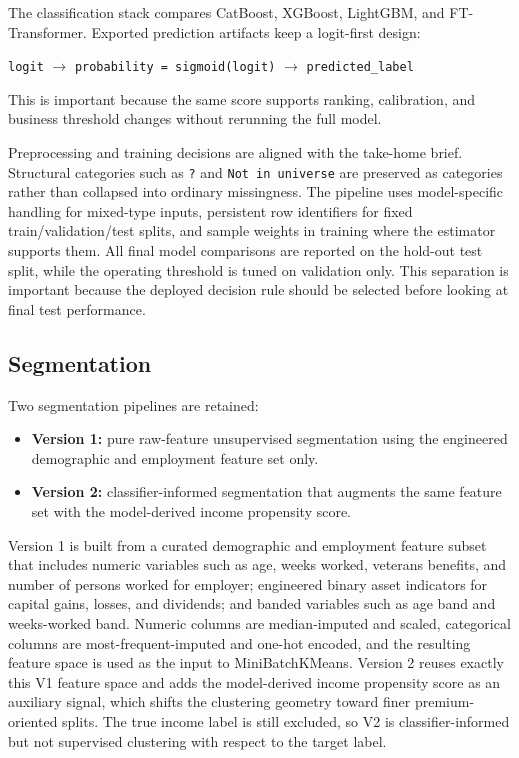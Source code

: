 \documentclass[12pt]{article}
\begin{document}
The classification stack compares CatBoost, XGBoost, LightGBM, and
FT-Transformer. Exported prediction artifacts keep a logit-first design:

\begin{center}
\texttt{logit} $\rightarrow$ \texttt{probability = sigmoid(logit)} $\rightarrow$
\texttt{predicted\_label}
\end{center}

This is important because the same score supports ranking, calibration, and
business threshold changes without rerunning the full model.

Preprocessing and training decisions are aligned with the take-home brief.
Structural categories such as \texttt{?} and \texttt{Not in universe} are
preserved as categories rather than collapsed into ordinary missingness. The
pipeline uses model-specific handling for mixed-type inputs, persistent row
identifiers for fixed train/validation/test splits, and sample weights in
training where the estimator supports them. All final model comparisons are
reported on the hold-out test split, while the operating threshold is tuned on
validation only. This separation is important because the deployed decision rule
should be selected before looking at final test performance.

\subsection{Segmentation}

Two segmentation pipelines are retained:

\begin{itemize}
\item \textbf{Version 1:} pure raw-feature unsupervised segmentation using the
engineered demographic and employment feature set only.
\item \textbf{Version 2:} classifier-informed segmentation that augments the
same feature set with the model-derived income propensity score.
\end{itemize}

Version 1 is built from a curated demographic and employment feature subset that
includes numeric variables such as age, weeks worked, veterans benefits, and
number of persons worked for employer; engineered binary asset indicators for
capital gains, losses, and dividends; and banded variables such as age band and
weeks-worked band. Numeric columns are median-imputed and scaled, categorical
columns are most-frequent-imputed and one-hot encoded, and the resulting feature
space is used as the input to MiniBatchKMeans. Version 2 reuses exactly this V1
feature space and adds the model-derived income propensity score as an auxiliary
signal, which shifts the clustering geometry toward finer premium-oriented
splits. The true income label is still excluded, so V2 is classifier-informed
but not supervised clustering with respect to the target label.
\end{document}
